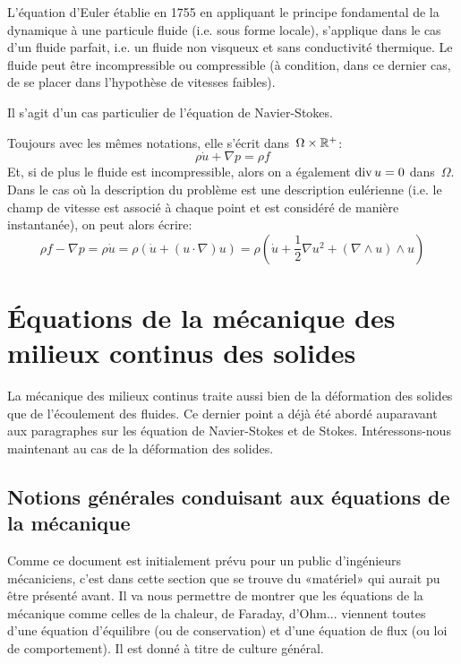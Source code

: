 L'équation d'Euler établie en 1755 en appliquant le principe fondamental de la dynamique à une particule fluide (i.e. sous forme locale), s'applique dans le cas d'un fluide parfait, i.e. un fluide non visqueux et sans conductivité thermique. Le fluide peut être incompressible ou compressible (à condition, dans ce dernier cas, de se placer dans l'hypothèse de vitesses faibles). 

Il s'agit d'un cas particulier de l'équation de Navier-Stokes.

\medskip
Toujours avec les mêmes notations, elle s'écrit dans~$\Omega\times\mathbb R^+$:
\begin{equation}
\rho \dot{u} + \nabla p = \rho f
\end{equation}
Et, si de plus le fluide est incompressible, alors on a également 
$\operatorname{div} u = 0$ dans~$\Omega$.
\medskipvm{}
Dans le cas où la description du problème est une description eulérienne (i.e. le champ de vitesse est associé à chaque point et est considéré de manière instantanée), on peut alors écrire:
\begin{equation}
  \rho f - \nabla p = \rho \dot{u} =
	\rho \left(\dot{u} + (u\cdot\nabla)u \right)=
	\rho \left( \dot{u} + \frac12 \nabla u^2 + (\nabla\wedge u)\wedge u \right)
\end{equation}
\medskipvm
{}

\medskip
\section{Équations de la mécanique des milieux continus des solides}
La mécanique des milieux continus traite aussi bien de la déformation des solides que de l'écoulement des fluides. Ce dernier point a déjà été abordé auparavant aux paragraphes sur les équation de Navier-Stokes et de Stokes. Intéressons-nous maintenant au cas de la déformation des solides.

\medskip{}
\subsection{Notions générales conduisant aux équations de la mécanique}
Comme ce document est initialement prévu pour un public d'ingénieurs mécaniciens, c'est dans cette section que se trouve du «matériel» qui aurait pu être présenté avant. Il va nous permettre de montrer que les équations de la mécanique comme celles de la chaleur, de Faraday, d'Ohm... viennent toutes d'une équation d'équilibre (ou de conservation) et d'une équation de flux (ou loi de comportement). Il est donné à titre de culture général.


